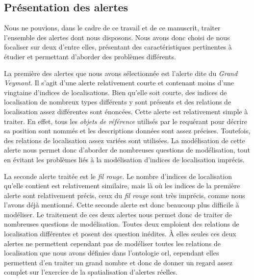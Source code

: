 \subsection{Présentation des alertes}

Nous ne pouvions, dans le cadre de ce travail et de ce manuscrit,
traiter l'ensemble des alertes dont nous disposons. Nous avons donc
choisi de nous focaliser sur deux d'entre elles, présentant des
caractéristiques pertinentes à étudier et permettant d'aborder des
problèmes différents.

La première des alertes que nous avons sélectionnée est l’alerte dite
du \emph{Grand Veymont.} Il s'agit d'une alerte relativement courte et
contenant moins d'une vingtaine d'indices de localisations. Bien
qu'elle soit courte, des indices de localisation de nombreux types
différents y sont présents et des relations de localisation assez
différentes sont énoncées. Cette alerte est relativement simple à
traiter. En effet, tous les \emph{objets de référence} utilisés par le
requérant pour décrire sa position sont nommés et les descriptions
données sont assez précises. Toutefois, des relations de localisation
assez variées sont utilisées. La modélisation de cette alerte nous
permet donc d'aborder de nombreuses questions de modélisation, tout en
évitant les problèmes liés à la modélisation d'indices de localisation
imprécis.

La seconde alerte traitée est le \emph{fil rouge.} Le nombre d'indices
de localisation qu'elle contient est relativement similaire, mais là
où les indices de la première alerte sont relativement précis, ceux du
\emph{fil rouge} sont très imprécis, comme nous l'avons déjà
mentionné. Cette seconde alerte est donc beaucoup plus difficile à
modéliser. Le traitement de ces deux alertes nous permet donc de
traiter de nombreuses questions de modélisation. Toutes deux emploient
des relations de localisation différentes et posent des question
inédites. À elles seules ces deux alertes ne permettent cependant pas
de modéliser toutes les relations de localisation que nous avons
définies dans l'ontologie \ac{orl}, cependant elles permettent d'en
traiter un grand nombre et donc de donner un regard assez complet sur
l'exercice de la spatialisation d'alertes réelles.

